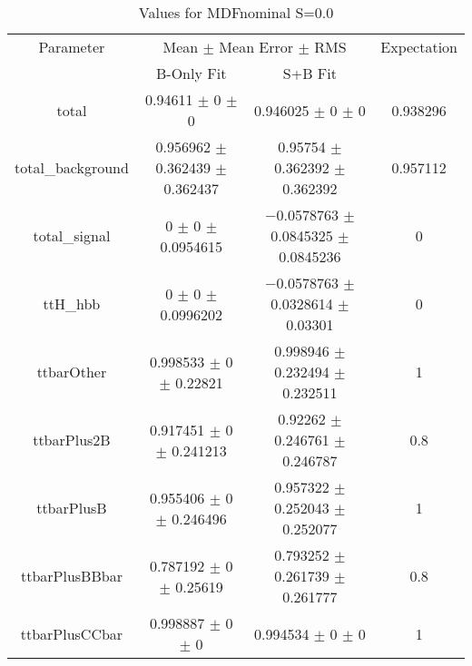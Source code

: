 \begin{table}
\centering
\caption{Values for MDFnominal S=0.0}
\begin{tabular}{cccc}
\toprule
Parameter & \multicolumn{2}{c}{Mean $\pm$ Mean Error $\pm$ RMS} & Expectation\\
 & B-Only Fit & S+B Fit & \\
\midrule
total & \num{0.94611} $\pm$ \num{0} $\pm$ \num{0} & \num{0.946025} $\pm$ \num{0} $\pm$ \num{0} & \num{0.938296}\\
total\_background & \num{0.956962} $\pm$ \num{0.362439} $\pm$ \num{0.362437} & \num{0.95754} $\pm$ \num{0.362392} $\pm$ \num{0.362392} & \num{0.957112}\\
total\_signal & \num{0} $\pm$ \num{0} $\pm$ \num{0.0954615} & \num{-0.0578763} $\pm$ \num{0.0845325} $\pm$ \num{0.0845236} & \num{0}\\
ttH\_hbb & \num{0} $\pm$ \num{0} $\pm$ \num{0.0996202} & \num{-0.0578763} $\pm$ \num{0.0328614} $\pm$ \num{0.03301} & \num{0}\\
ttbarOther & \num{0.998533} $\pm$ \num{0} $\pm$ \num{0.22821} & \num{0.998946} $\pm$ \num{0.232494} $\pm$ \num{0.232511} & \num{1}\\
ttbarPlus2B & \num{0.917451} $\pm$ \num{0} $\pm$ \num{0.241213} & \num{0.92262} $\pm$ \num{0.246761} $\pm$ \num{0.246787} & \num{0.8}\\
ttbarPlusB & \num{0.955406} $\pm$ \num{0} $\pm$ \num{0.246496} & \num{0.957322} $\pm$ \num{0.252043} $\pm$ \num{0.252077} & \num{1}\\
ttbarPlusBBbar & \num{0.787192} $\pm$ \num{0} $\pm$ \num{0.25619} & \num{0.793252} $\pm$ \num{0.261739} $\pm$ \num{0.261777} & \num{0.8}\\
ttbarPlusCCbar & \num{0.998887} $\pm$ \num{0} $\pm$ \num{0} & \num{0.994534} $\pm$ \num{0} $\pm$ \num{0} & \num{1}\\
\bottomrule
\end{tabular}
\end{table}